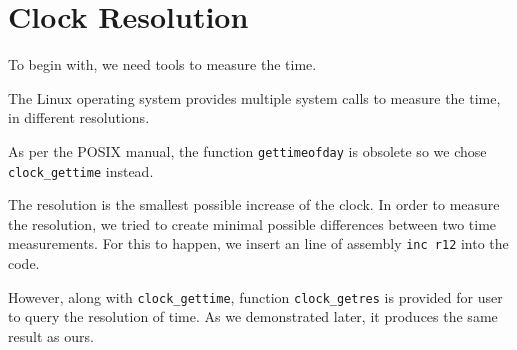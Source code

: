 \section{Clock Resolution}

To begin with, we need tools to measure the time.

The Linux operating system provides multiple system calls to measure the time, in different resolutions.

As per the POSIX manual\cite{posix_clock_gettime}, the function \texttt{gettimeofday} is obsolete so we chose \texttt{clock\_gettime} instead.

The resolution is the smallest possible increase of the clock. In order to measure the resolution, we tried to create minimal possible differences between two time measurements. For this to happen, we insert an line of assembly \texttt{inc r12} into the code.

However, along with \texttt{clock\_gettime}, function \texttt{clock\_getres} is provided for user to query the resolution of time. As we demonstrated later, it produces the same result as ours.